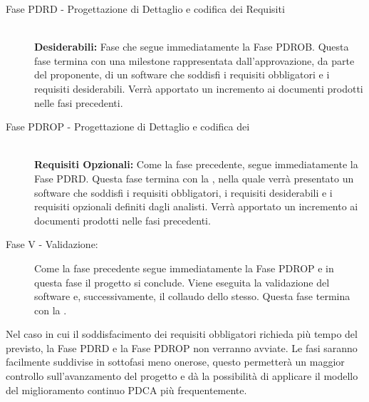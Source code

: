 \documentclass[../PianoProgetto.tex]{subfiles}
\begin{document}
\begin{description}
  
	\item[Fase PDRD - Progettazione di Dettaglio e codifica dei Requisiti] \ \\
		\textbf{Desiderabili:}
		Fase che segue immediatamente la Fase PDROB. Questa fase termina con una milestone rappresentata dall'approvazione, da parte del proponente, di un software che soddisfi i requisiti obbligatori e i requisiti desiderabili.
		Verrà apportato un incremento ai documenti prodotti nelle fasi precedenti.


	\item[Fase PDROP - Progettazione di Dettaglio e codifica dei ] \ \\
		\textbf{Requisiti Opzionali:}
		Come la fase precedente, segue immediatamente la Fase PDRD. Questa fase termina con la \revisionediqualifica , nella quale verrà presentato un software che soddisfi i requisiti obbligatori, i requisiti desiderabili e i requisiti opzionali definiti dagli analisti.
		Verrà apportato un incremento ai documenti prodotti nelle fasi precedenti.


	\item[Fase V - Validazione:] Come la fase precedente segue immediatamente la Fase PDROP e in questa fase il progetto si conclude. Viene eseguita la validazione del software e, successivamente, il collaudo dello stesso.
		Questa fase termina con la \revisionediaccettazione . 
		
	\end{description}
	
		Nel caso in cui il soddisfacimento dei requisiti obbligatori richieda più tempo del previsto, la Fase PDRD e la Fase PDROP non verranno avviate.
		Le fasi saranno facilmente suddivise in sottofasi meno onerose, questo permetterà un maggior controllo sull'avanzamento del progetto e dà la possibilità di applicare il modello del miglioramento continuo PDCA più frequentemente.
\end{document}
